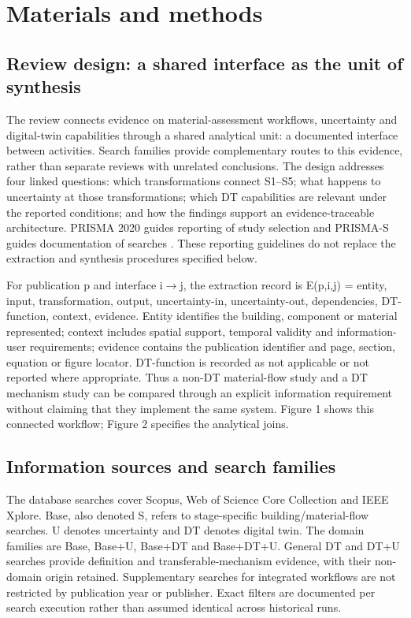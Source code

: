 \section{Materials and methods}

\subsection{Review design: a shared interface as the unit of synthesis}

The review connects evidence on material-assessment workflows, uncertainty and digital-twin capabilities through a shared analytical unit: a documented interface between activities. Search families provide complementary routes to this evidence, rather than separate reviews with unrelated conclusions. The design addresses four linked questions: which transformations connect S1--S5; what happens to uncertainty at those transformations; which DT capabilities are relevant under the reported conditions; and how the findings support an evidence-traceable architecture. PRISMA 2020 guides reporting of study selection and PRISMA-S guides documentation of searches \citep{M01,M02}. These reporting guidelines do not replace the extraction and synthesis procedures specified below.

For publication p and interface i$\rightarrow$j, the extraction record is E(p,i,j) = {entity, input, transformation, output, uncertainty-in, uncertainty-out, dependencies, DT-function, context, evidence}. Entity identifies the building, component or material represented; context includes spatial support, temporal validity and information-user requirements; evidence contains the publication identifier and page, section, equation or figure locator. DT-function is recorded as not applicable or not reported where appropriate. Thus a non-DT material-flow study and a DT mechanism study can be compared through an explicit information requirement without claiming that they implement the same system. Figure 1 shows this connected workflow; Figure 2 specifies the analytical joins.

\subsection{Information sources and search families}

The database searches cover Scopus, Web of Science Core Collection and IEEE Xplore. Base, also denoted S, refers to stage-specific building/material-flow searches. U denotes uncertainty and DT denotes digital twin. The domain families are Base, Base+U, Base+DT and Base+DT+U. General DT and DT+U searches provide definition and transferable-mechanism evidence, with their non-domain origin retained. Supplementary searches for integrated workflows are not restricted by publication year or publisher. Exact filters are documented per search execution rather than assumed identical across historical runs.

